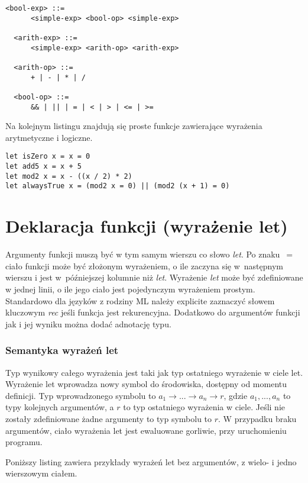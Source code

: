 \documentclass[declaration,shortabstract]{iithesis}
\begin{document}
\begin{lstlisting}[frame=lines]
  <bool-exp> ::=
      <simple-exp> <bool-op> <simple-exp> 
  
  <arith-exp> ::=
      <simple-exp> <arith-op> <arith-exp> 
  
  <arith-op> ::=
      + | - | * | /
  
  <bool-op> ::=
      && | || | = | < | > | <= | >= 
\end{lstlisting}

Na kolejnym listingu znajdują się proste funkcje zawierające wyrażenia 
arytmetyczne i logiczne.

\begin{lstlisting}[frame=lines]
let isZero x = x = 0 
let add5 x = x + 5
let mod2 x = x - ((x / 2) * 2)
let alwaysTrue x = (mod2 x = 0) || (mod2 (x + 1) = 0)
\end{lstlisting}

\section{Deklaracja funkcji (wyrażenie let)}

Argumenty funkcji muszą być w tym samym wierszu co słowo \textit{let}. 
Po znaku~$=$ ciało funkcji może być złożonym wyrażeniem, o ile zaczyna się 
w~następnym wierszu i 
jest w~późniejszej kolumnie niż \textit{let}. Wyrażenie \textit{let} może być 
zdefiniowane w jednej linii, o ile jego ciało jest pojedynczym wyrażeniem prostym.
Standardowo dla języków z rodziny ML należy explicite zaznaczyć słowem 
kluczowym \textit{rec} jeśli funkcja jest rekurencyjna. Dodatkowo do argumentów
funkcji jak i jej wyniku można dodać adnotację typu.

\subsubsection{Semantyka wyrażeń let}

Typ wynikowy całego wyrażenia jest taki jak typ ostatniego wyrażenie w ciele 
let. Wyrażenie let wprowadza nowy symbol do środowiska, dostępny od momentu 
definicji. Typ wprowadzonego symbolu to $ a_1 \rightarrow ...\rightarrow a_n 
\rightarrow r $, gdzie $a_1, ..., a_n$ to typy kolejnych argumentów, a $r$ to 
typ ostatniego wyrażenia w ciele. Jeśli nie zostały zdefiniowane żadne argumenty 
to typ symbolu to $r$. W przypadku braku argumentów, ciało wyrażenia let 
jest ewaluowane gorliwie, przy uruchomieniu programu.

Poniższy listing zawiera przykłady wyrażeń let bez argumentów, 
z wielo- i jedno wierszowym ciałem.
\end{document}
